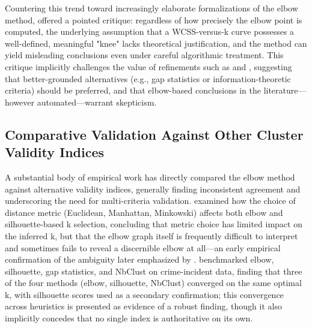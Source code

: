 Countering this trend toward increasingly elaborate formalizations of the elbow method, \cite{schubert2023stop} offered a pointed critique: regardless of how precisely the elbow point is computed, the underlying assumption that a WCSS-versus-k curve possesses a well-defined, meaningful "knee" lacks theoretical justification, and the method can yield misleading conclusions even under careful algorithmic treatment. This critique implicitly challenges the value of refinements such as \cite{shi2021quantitative} and \cite{herdiana2026more}, suggesting that better-grounded alternatives (e.g., gap statistics or information-theoretic criteria) should be preferred, and that elbow-based conclusions in the literature---however automated---warrant skepticism.

\subsection{Comparative Validation Against Other Cluster Validity Indices}
A substantial body of empirical work has directly compared the elbow method against alternative validity indices, generally finding inconsistent agreement and underscoring the need for multi-criteria validation. \cite{saputra2020effect} examined how the choice of distance metric (Euclidean, Manhattan, Minkowski) affects both elbow and silhouette-based k selection, concluding that metric choice has limited impact on the inferred k, but that the elbow graph itself is frequently difficult to interpret and sometimes fails to reveal a discernible elbow at all---an early empirical confirmation of the ambiguity later emphasized by \cite{schubert2023stop}. \cite{sagala2022discovering} benchmarked elbow, silhouette, gap statistics, and NbClust on crime-incident data, finding that three of the four methods (elbow, silhouette, NbClust) converged on the same optimal k, with silhouette scores used as a secondary confirmation; this convergence across heuristics is presented as evidence of a robust finding, though it also implicitly concedes that no single index is authoritative on its own.


